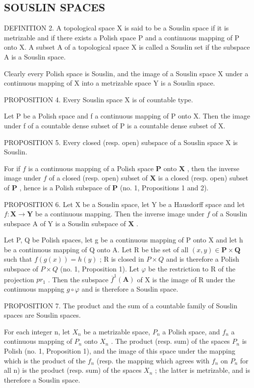 \subsection{SOUSLIN SPACES}

DEFINITION 2. A topological space X is said to be a Souslin space if it is metrizable and if there exists a Polish space P and a continuous mapping of P onto X. A subset A of a topological space X is called a Souslin set if the subspace A is a Souslin space.

Clearly every Polish space is Souslin, and the image of a Souslin space X under a continuous mapping of X into a metrizable space Y is a Souslin space.

PROPOSITION 4. Every Souslin space X is of countable type.

Let P be a Polish space and f a continuous mapping of P onto X. Then the image under f of a countable dense subset of P is a countable dense subset of X.

PROPOSITION 5. Every closed (resp. open) subspace of a Souslin space X is Souslin.

For if \(f\) is a continuous mapping of a Polish space \(\mathbf{P}\) onto \(\mathbf{X}\) , then the inverse image under \(f\) of a closed (resp. open) subset of \(\mathbf{X}\) is a closed (resp. open) subset of \(\mathbf{P}\) , hence is a Polish subspace of \(\mathbf{P}\) (no. 1, Propositions 1 and 2).

PROPOSITION 6. Let X be a Souslin space, let Y be a Hausdorff space and let \(f: \mathbf{X} \to \mathbf{Y}\) be a continuous mapping. Then the inverse image under \(f\) of a Souslin subspace A of Y is a Souslin subspace of \(\mathbf{X}\) .

Let P, Q be Polish spaces, let g be a continuous mapping of P onto X and let h be a continuous mapping of Q onto A. Let R be the set of all \((x,y)\in\mathbf{P}\times\mathbf{Q}\) such that \(f(g(x))=h(y)\) ; R is closed in \(P\times Q\) and is therefore a Polish subspace of \(P\times Q\) (no. 1, Proposition 1). Let \(\varphi\) be the restriction to R of the projection \(pr_{1}\) . Then the subspace \(\overline{f}^{1}(\mathbf{A})\) of X is the image of R under the continuous mapping \(g\circ\varphi\) and is therefore a Souslin space.

PROPOSITION 7. The product and the sum of a countable family of Souslin spaces are Souslin spaces.

For each integer n, let \(X_{n}\) be a metrizable space, \(P_{n}\) a Polish space, and \(f_{n}\) a continuous mapping of \(P_{n}\) onto \(X_{n}\) . The product (resp. sum) of the spaces \(P_{n}\) is Polish (no. 1, Proposition 1), and the image of this space under the mapping which is the product of the \(f_{n}\) (resp. the mapping which agrees with \(f_{n}\) on \(P_{n}\) for all n) is the product (resp. sum) of the spaces \(X_{n}\) ; the latter is metrizable, and is therefore a Souslin space.

